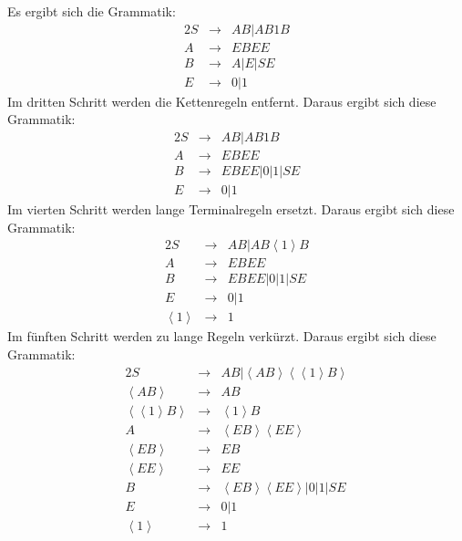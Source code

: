 \documentclass[10pt,a4paper,oneside,ngerman,numbers=noenddot]{scrartcl}
\begin{document}
Es ergibt sich die Grammatik:\\
\begin{alignat*}{2}
S &\rightarrow & AB | AB1B \\
A &\rightarrow & EBEE \\
B &\rightarrow & A | E | SE \\
E &\rightarrow & 0 | 1
\end{alignat*}
Im dritten Schritt werden die Kettenregeln entfernt. Daraus ergibt sich diese Grammatik:\\
\begin{alignat*}{2}
S &\rightarrow & AB | AB1B \\
A &\rightarrow & EBEE \\
B &\rightarrow & EBEE | 0 | 1 | SE \\
E &\rightarrow & 0 | 1
\end{alignat*}
Im vierten Schritt werden lange Terminalregeln ersetzt. Daraus ergibt sich diese Grammatik:\\
\begin{alignat*}{2}
S &\rightarrow & AB | AB\left\langle 1 \right\rangle B \\
A &\rightarrow & EBEE \\
B &\rightarrow & EBEE | 0 | 1 | SE \\
E &\rightarrow & 0 | 1 \\
\left\langle 1 \right\rangle &\rightarrow & 1
\end{alignat*}
Im fünften Schritt werden zu lange Regeln verkürzt. Daraus ergibt sich diese Grammatik:\\
\begin{alignat*}{2}
S &\rightarrow & AB | \left\langle AB \right\rangle \left\langle \left\langle 1 \right\rangle B \right\rangle \\
\left\langle AB \right\rangle &\rightarrow & AB \\
\left\langle \left\langle 1 \right\rangle B \right\rangle &\rightarrow &\left\langle 1 \right\rangle B \\
A &\rightarrow & \left\langle EB \right\rangle \left\langle EE \right\rangle \\
\left\langle EB \right\rangle &\rightarrow & EB \\
\left\langle EE \right\rangle &\rightarrow & EE \\
B &\rightarrow & \left\langle EB \right\rangle \left\langle EE \right\rangle | 0 | 1 | SE \\
E &\rightarrow & 0 | 1 \\
\left\langle 1 \right\rangle &\rightarrow & 1
\end{alignat*}
\end{document}
